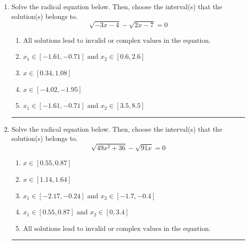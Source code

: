 \documentclass[14pt]{extbook}
\newcommand{\litem}[1]{\item#1\hspace*{-1cm}\rule{\textwidth}{0.4pt}}
\begin{document}
\begin{enumerate}
\litem{
Solve the radical equation below. Then, choose the interval(s) that the solution(s) belongs to.\[ \sqrt{-3 x - 4} - \sqrt{2 x - 7} = 0 \]\begin{enumerate}[label=\Alph*.]
\item \( \text{All solutions lead to invalid or complex values in the equation.} \)
\item \( x_1 \in [-1.61, -0.71] \text{ and } x_2 \in [0.6,2.6] \)
\item \( x \in [0.34,1.08] \)
\item \( x \in [-4.02,-1.95] \)
\item \( x_1 \in [-1.61, -0.71] \text{ and } x_2 \in [3.5,8.5] \)

\end{enumerate} }
\litem{
Solve the radical equation below. Then, choose the interval(s) that the solution(s) belongs to.\[ \sqrt{49 x^2 + 36} - \sqrt{91 x} = 0 \]\begin{enumerate}[label=\Alph*.]
\item \( x \in [0.55,0.87] \)
\item \( x \in [1.14,1.64] \)
\item \( x_1 \in [-2.17, -0.24] \text{ and } x_2 \in [-1.7,-0.4] \)
\item \( x_1 \in [0.55, 0.87] \text{ and } x_2 \in [0,3.4] \)
\item \( \text{All solutions lead to invalid or complex values in the equation.} \)


\end{enumerate}}
\end{enumerate}
\end{document}
